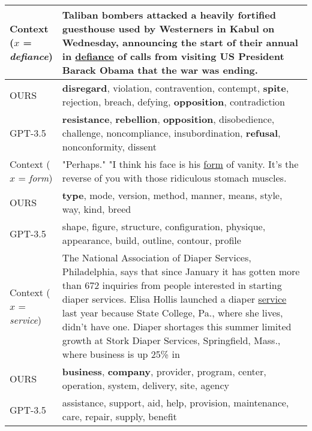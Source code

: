 \documentclass[11pt]{article}
\newcommand{\ex}[1]{\textit{#1}\xspace}
\begin{document}
\begin{table*}[t!]
\begin{center}
\begin{adjustbox}{max width=\textwidth}
\begin{tabular}{m{0.15\linewidth}m{0.9\linewidth}}
\makecell[l]{Context \\($x$ = \ex{defiance}) }&  Taliban bombers attacked a heavily fortified guesthouse used by Westerners in Kabul on Wednesday, announcing the start of their annual in \underline{defiance} of calls from visiting US President Barack Obama that the war was ending.
\\\midrule
OURS & \textbf{disregard}, violation, contravention, contempt, \textbf{spite}, rejection, breach, defying, \textbf{opposition}, contradiction
\\\midrule
GPT-3.5&\textbf{resistance}, \textbf{rebellion}, \textbf{opposition}, disobedience, challenge, noncompliance, insubordination, \textbf{refusal}, nonconformity, dissent\\
\midrule\midrule
\makecell[l]{Context \\($x$ = \ex{form}) }& "Perhaps." "I think his face is his \underline{form} of vanity. It's the reverse of you with those ridiculous stomach muscles.
\\\midrule
OURS &\textbf{type}, mode, version, method, manner, means, style, way, kind, breed
\\\midrule
GPT-3.5 &shape, figure, structure, configuration, physique, appearance, build, outline, contour, profile
\\
\midrule\midrule
\makecell[l]{Context \\($x$ = \ex{service})} & The National Association of Diaper Services, Philadelphia, says that since January it has gotten more than 672 inquiries from people interested in starting diaper services. Elisa Hollis launched a diaper \underline{service} last year because State College, Pa., where she lives, didn't have one. Diaper shortages this summer limited growth at Stork Diaper Services, Springfield, Mass., where business is up 25\% in
\\\midrule
OURS &\textbf{business}, \textbf{company}, provider, program, center, operation, system, delivery, site, agency
\\\midrule
GPT-3.5 &assistance, support, aid, help, provision, maintenance, care, repair, supply, benefit
\\

\midrule\midrule



\end{tabular}
\end{adjustbox}
\end{center}
\end{table*}
\end{document}
